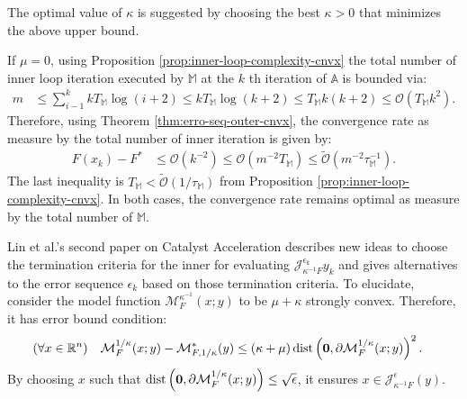 \documentclass[12pt]{article}
\begin{document}
            The optimal value of $\kappa$ is suggested by choosing the best $\kappa > 0$ that minimizes the above upper bound. 
            \par
            If $\mu = 0$, using Proposition \ref{prop:inner-loop-complexity-cnvx} the total number of inner loop iteration executed by $\mathbb M$ at the $k$ th iteration of $\mathbb A$ is bounded via: 
            \begin{align*}
                m &\le \sum_{i - 1}^{k} k T_{\mathbb M} \log(i + 2) \le k T_{\mathbb M} \log(k + 2) 
                \le T_{\mathbb M}k(k + 2) 
                \le 
                \mathcal O(T_{\mathbb M} k^2). 
            \end{align*}
            Therefore, using Theorem \ref{thm:erro-seq-outer-cnvx}, the convergence rate as measure by the total number of inner iteration is given by: 
            \begin{align*}
                F(x_k)- F^* &\le 
                \mathcal O(k^{-2})\le 
                \mathcal O
                    \left(
                        m^{-2}T_{\mathbb M}
                    \right) 
                    \le \widetilde{\mathcal O}
                        \left(m^{-2}\tau_{\mathbb M}^{-1}\right). 
            \end{align*}
            The last inequality is $T_{\mathbb M} < \widetilde{\mathcal O}(1/\tau_{\mathbb M})$ from Proposition \ref{prop:inner-loop-complexity-cnvx}. 
            In both cases, the convergence rate remains optimal as measure by the total number of $\mathbb M$. 
            \par 
            Lin et al.'s second paper on Catalyst Acceleration \cite{lin_catalyst_2018} describes new ideas to choose the termination criteria for the inner for evaluating $\mathcal J_{\kappa^{-1}F}^{\epsilon_k} y_k$ and gives alternatives to the error sequence $\epsilon_k$ based on those termination criteria. 
            To elucidate, consider the model function $\mathcal M_F^{\kappa^{-1}}(x; y)$ to be $\mu + \kappa$ strongly convex. 
            Therefore, it has error bound condition: 
            \begin{align*}
                (\forall x\in \mathbb R^n) \quad 
                \mathcal M^{1/\kappa}_F(x; y) -
                \mathcal M_{F, 1/\kappa}^*(y) 
                &\le (\kappa + \mu)\operatorname{dist}
                    \left(
                        \mathbf 0, \partial \mathcal M^{1/\kappa}_F(x; y)
                    \right)^2. 
            \end{align*}
            By choosing $x$ such that $\operatorname{dist}\left(\mathbf 0, \partial \mathcal M_F^{1/\kappa}(x; y)\right) \le \sqrt{\epsilon}$, it ensures $x \in \mathcal J^\epsilon_{\kappa^{-1}F}(y)$. 
\end{document}

